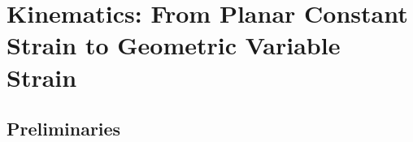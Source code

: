 \section{Kinematics: From Planar Constant Strain to Geometric Variable Strain}\label{sec:background:kinematics}

\subsection{Preliminaries}
